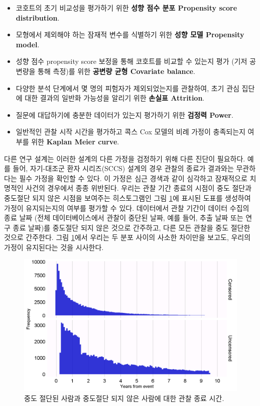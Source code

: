 \documentclass[10.5pt]{book}
\providecommand{\tightlist}{%
  \setlength{\itemsep}{0pt}\setlength{\parskip}{0pt}}
\theoremstyle{definition}
\theoremstyle{definition}
\theoremstyle{definition}
\theoremstyle{remark}
\begin{document}
\begin{itemize}
\tightlist
\item
  코호트의 초기 비교성을 평가하기 위한 \textbf{성향 점수 분포 Propensity
  score distribution}.
\item
  모형에서 제외해야 하는 잠재적 변수를 식별하기 위한 \textbf{성향 모델
  Propensity model}.
\item
  성향 점수 propensity score 보정을 통해 코호트를 비교할 수 있는지 평가
  (기저 공변량을 통해 측정)를 위한 \textbf{공변량 균형 Covariate
  balance}.
\item
  다양한 분석 단계에서 몇 명의 피험자가 제외되었는지를 관찰하여, 초기
  관심 집단에 대한 결과의 일반화 가능성을 알리기 위한 \textbf{손실표
  Attrition}.
\item
  질문에 대답하기에 충분한 데이터가 있는지 평가하기 위한 \textbf{검정력
  Power}.
\item
  일반적인 관찰 시작 시간을 평가하고 콕스 Cox 모델의 비례 가정이
  충족되는지 여부를 위한 \textbf{Kaplan Meier curve}.
\end{itemize}

다른 연구 설계는 이러한 설계의 다른 가정을 검정하기 위해 다른 진단이
필요하다. 예를 들어, 자기-대조군 환자 시리즈(SCCS) 설계의 경우 관찰의
종료가 결과와는 무관하다는 필수 가정을 확인할 수 있다. 이 가정은 심근
경색과 같이 심각하고 잠재적으로 치명적인 사건의 경우에서 종종 위반된다.
우리는 관찰 기간 종료의 시점이 중도 절단과 중도절단 되지 않은 시점을
보여주는 히스토그램인 그림 \ref{fig:timeToObsEnd}에 표시된 도표를
생성하여 가정이 유지되는지의 여부를 평가할 수 있다. 데이터에서 관찰
기간이 데이터 수집의 종료 날짜 (전체 데이터베이스에서 관찰이 중단된
날짜, 예를 들어, 추출 날짜 또는 연구 종료 날짜)를 중도절단 되지 않은
것으로 간주하고, 다른 모든 관찰을 중도 절단한 것으로 간주한다. 그림
\ref{fig:timeToObsEnd}에서 우리는 두 분포 사이의 사소한 차이만을 보고도,
우리의 가정이 유지된다는 것을 시사한다.

\begin{figure}

{\centering \includegraphics[width=1\linewidth]{images/MethodValidity/timeToObsEnd} 

}

\caption{중도 절단된 사람과 중도절단 되지 않은 사람에 대한 관찰 종료 시간.}\label{fig:timeToObsEnd}
\end{figure}
\end{document}
